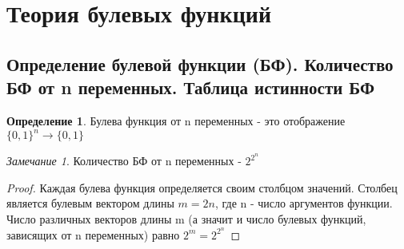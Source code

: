 \documentclass[a4paper]{article}
\theoremstyle{definition}
\newtheorem*{definition}{Определение}
\theoremstyle{remark}
\newtheorem*{remark}{Замечание}
\begin{document}
    \tableofcontents
    \setcounter{page}{1}
    \section{Теория булевых функций}
    \subsection{Определение булевой функции (БФ). Количество БФ от n переменных. Таблица истинности БФ}
    \begin{definition}
        Булева функция от n переменных - это отображение $\{0,1\}^n \rightarrow \{0, 1\}$
    \end{definition}

    \begin{remark}
        Количество БФ от n переменных - $2^{2^n}$
    \end{remark}
    \begin{proof}
        Каждая булева функция определяется своим столбцом значений.
         Столбец является булевым вектором длины $m=2n$, где n - число аргументов функции.
          Число различных векторов длины m (а значит и число булевых функций, зависящих от n переменных) равно $2^m=2^{2^n}$
    \end{proof}
\end{document}
